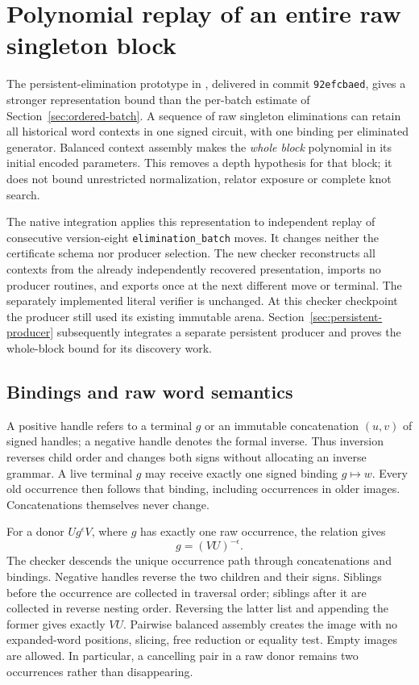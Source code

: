\section{Polynomial replay of an entire raw singleton block}
\label{sec:persistent-replay}

The persistent-elimination prototype in
, delivered in
commit \texttt{92efcbaed}, gives a stronger representation bound than the
per-batch estimate of Section~\ref{sec:ordered-batch}. A sequence of raw
singleton eliminations can retain all historical word contexts in one
signed circuit, with one binding per eliminated generator. Balanced context
assembly makes the \emph{whole block} polynomial in its initial encoded
parameters. This removes a depth hypothesis for that block; it does not
bound unrestricted normalization, relator exposure or complete knot search.

The native integration applies this representation to independent replay of
consecutive version-eight \texttt{elimination\_batch} moves. It changes neither
the certificate schema nor producer selection. The new checker reconstructs
all contexts from the already independently recovered presentation, imports
no producer routines, and exports once at the next different move or terminal.
The separately implemented literal verifier is unchanged. At this checker
checkpoint the producer still used its existing immutable arena.
Section~\ref{sec:persistent-producer} subsequently integrates a separate
persistent producer and proves the whole-block bound for its discovery work.

\subsection{Bindings and raw word semantics}

A positive handle refers to a terminal $g$ or an immutable concatenation
$(u,v)$ of signed handles; a negative handle denotes the formal inverse.
Thus inversion reverses child order and changes both signs without allocating
an inverse grammar. A live terminal $g$ may receive exactly one signed binding
$g\mapsto w$. Every old occurrence then follows that binding, including
occurrences in older images. Concatenations themselves never change.

For a donor $U g^\epsilon V$, where $g$ has exactly one raw occurrence,
the relation gives
\[
                  g=(VU)^{-\epsilon}.
\]
The checker descends the unique occurrence path through concatenations and
bindings. Negative handles reverse the two children and their signs.
Siblings before the occurrence are collected in traversal order; siblings
after it are collected in reverse nesting order. Reversing the latter list
and appending the former gives exactly $VU$. Pairwise balanced assembly
creates the image with no expanded-word positions, slicing, free reduction
or equality test. Empty images are allowed. In particular, a cancelling pair
in a raw donor remains two occurrences rather than disappearing.

